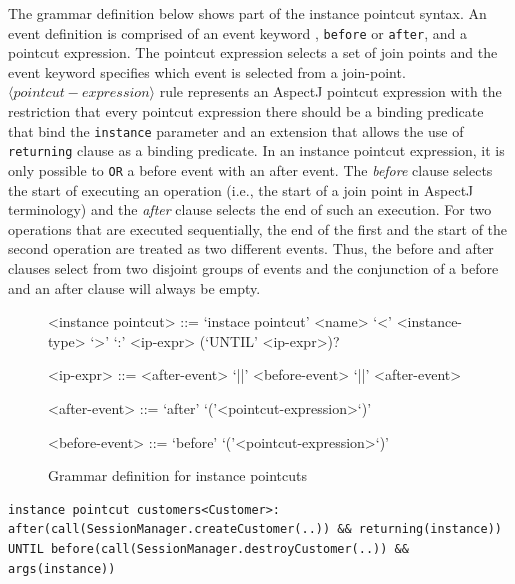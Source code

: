 \documentclass{llncs}
\begin{document}
The grammar definition below shows part of the instance pointcut syntax. 
An event definition is comprised of an event keyword , \texttt{before} or \texttt{after}, and a pointcut expression.
The pointcut expression selects a set of join points and the event keyword specifies which event is selected from a join-point. 
 $\langle pointcut-expression\rangle$ rule represents an AspectJ pointcut expression with the restriction that every pointcut expression there should be a binding predicate that bind the \texttt{instance} parameter and an extension that allows the use of \texttt{returning} clause as a binding predicate. 
In an instance pointcut expression, it is only possible to \texttt{OR} a before event with an after event. 
The \emph{before} clause selects the start of executing an operation (i.e., the start of a join point in AspectJ terminology) and the \emph{after} clause selects the end of such an execution. 
For two operations that are executed sequentially, the end of the first and the start of the second operation are treated as two different events. Thus, the before and after clauses select from two disjoint groups of events and the conjunction of a before and an after clause will always be empty.


\begin{figure}[h]
\begin{grammar}
<instance pointcut> ::= `instace pointcut' <name> `<' <instance-type> `>' `:'
<ip-expr> (`UNTIL' <ip-expr>)? 

<ip-expr> ::= <after-event> `||' <before-event>  `||' <after-event>  

<after-event> ::= `after' `('<pointcut-expression>`)'

<before-event> ::= `before' `('<pointcut-expression>`)'
\end{grammar}
\caption{Grammar definition for instance pointcuts}
\label{fig:grammar1}
\end{figure}


\begin{lstlisting}[float=h!, caption={A basic instance pointcut declaration with add and remove expressions}, label={lst:basic}]
instance pointcut customers<Customer>: after(call(SessionManager.createCustomer(..)) && returning(instance)) UNTIL before(call(SessionManager.destroyCustomer(..)) && args(instance))
\end{lstlisting}
\end{document}
